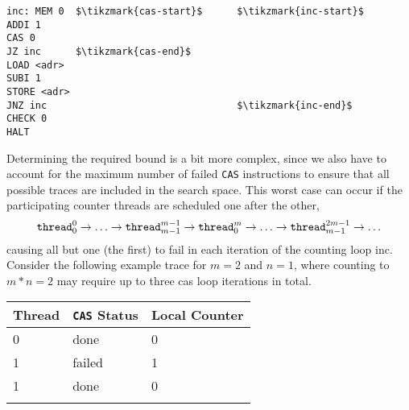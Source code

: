 \begin{minipage}{\textwidth}
\begin{lstlisting}[style=asm, caption={Consistent counter template.}, label={lst:count:cas}, mathescape, xleftmargin=0.39\textwidth]
inc: MEM 0  $\tikzmark{cas-start}$      $\tikzmark{inc-start}$
ADDI 1
CAS 0
JZ inc      $\tikzmark{cas-end}$
LOAD <adr>
SUBI 1
STORE <adr>
JNZ inc                                 $\tikzmark{inc-end}$
CHECK 0
HALT
\end{lstlisting}
\end{minipage}

Determining the required bound is a bit more complex, since we also have to account for the maximum number of failed \lstinline[style=asm]{CAS} instructions to ensure that all possible traces are included in the search space.
This worst case can occur if the participating counter threads are scheduled one after the other,
\[
  \texttt{thread}^0_0 \rightarrow \ldots \rightarrow \texttt{thread}^{m - 1}_{m - 1} \rightarrow \texttt{thread}^m_0 \rightarrow \ldots \rightarrow \texttt{thread}^{2m - 1}_{m - 1} \rightarrow \ldots
\]
causing all but one (the first) to fail in each iteration of the counting loop {\color{red!60!black}\textsf{inc}}.
Consider the following example trace
for $m = 2$ and $n = 1$,
where counting to $m * n = 2$ may require up to
three {\color{red!60!black}\textsf{cas}} loop iterations in total.
\begin{center}
  \begin{tabu}{lll}
    Thread & \lstinline[style=asm]{CAS} Status & Local Counter \\
     & done & 0 \\
    1 & failed & 1 \\
    \hline
     & done & 0 \\
    \lasthline
  \end{tabu}
\end{center}
